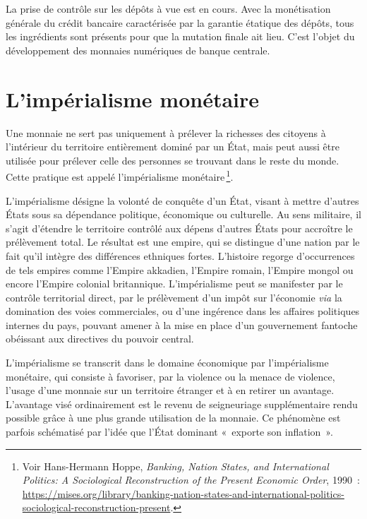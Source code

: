 \documentclass[a4paper,notitlepage]{article}
\newcommand{\eng}[1]{{\NoAutoSpaceBeforeFDP\emph{#1}}}  %
\newcommand{\sfootnote}{\,\footnote}
\begin{document}
La prise de contrôle sur les dépôts à vue est en cours. Avec la monétisation générale du crédit bancaire caractérisée par la garantie étatique des dépôts, tous les ingrédients sont présents pour que la mutation finale ait lieu. C'est l'objet du développement des monnaies numériques de banque centrale.

\section{L'impérialisme monétaire} %

Une monnaie ne sert pas uniquement à prélever la richesses des citoyens à l'intérieur du territoire entièrement dominé par un État, mais peut aussi être utilisée pour prélever celle des personnes se trouvant dans le reste du monde. Cette pratique est appelé l'impérialisme monétaire\sfootnote{Voir Hans-Hermann Hoppe, \eng{Banking, Nation States, and International Politics: A Sociological Reconstruction of the Present Economic Order}, 1990~: \url{https://mises.org/library/banking-nation-states-and-international-politics-sociological-reconstruction-present}.}.

L'impérialisme désigne la volonté de conquête d'un État, visant à mettre d'autres États sous sa dépendance politique, économique ou culturelle. Au sens militaire, il s'agit d'étendre le territoire contrôlé aux dépens d'autres États pour accroître le prélèvement total. Le résultat est une empire, qui se distingue d'une nation par le fait qu'il intègre des différences ethniques fortes. L'histoire regorge d'occurrences de tels empires comme l'Empire akkadien, l'Empire romain, l'Empire mongol ou encore l'Empire colonial britannique. L'impérialisme peut se manifester par le contrôle territorial direct, par le prélèvement d'un impôt sur l'économie \emph{via} la domination des voies commerciales, ou d'une ingérence dans les affaires politiques internes du pays, pouvant amener à la mise en place d'un gouvernement fantoche obéissant aux directives du pouvoir central.

L'impérialisme se transcrit dans le domaine économique par l'impérialisme monétaire, qui consiste à favoriser, par la violence ou la menace de violence, l'usage d'une monnaie sur un territoire étranger et à en retirer un avantage. L'avantage visé ordinairement est le revenu de seigneuriage supplémentaire rendu possible grâce à une plus grande utilisation de la monnaie. Ce phénomène est parfois schématisé par l'idée que l'État dominant «~exporte son inflation~».
\end{document}
